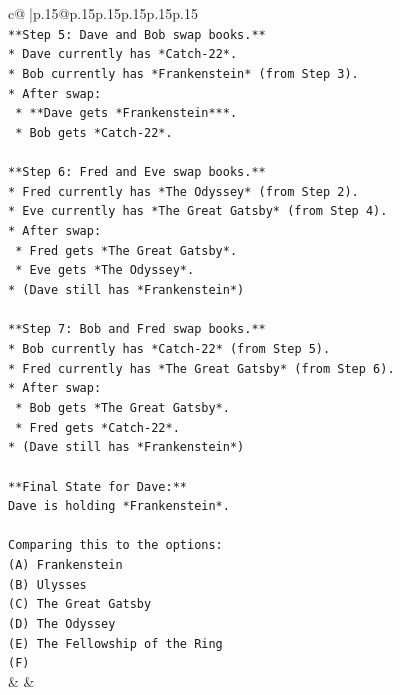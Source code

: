 \documentclass{article}
\begin{document}
{\begin{supertabular}{c@{$\;$}|p{.15\linewidth}@{}p{.15\linewidth}p{.15\linewidth}p{.15\linewidth}p{.15\linewidth}p{.15\linewidth}}
{{{\\ 
\texttt{**Step 5: Dave and Bob swap books.**} \\
\texttt{*   Dave currently has *Catch{-}22*.} \\
\texttt{*   Bob currently has *Frankenstein* (from Step 3).} \\
\texttt{*   After swap:} \\
\texttt{    *   **Dave gets *Frankenstein***.} \\
\texttt{    *   Bob gets *Catch{-}22*.} \\
\\ 
\texttt{**Step 6: Fred and Eve swap books.**} \\
\texttt{*   Fred currently has *The Odyssey* (from Step 2).} \\
\texttt{*   Eve currently has *The Great Gatsby* (from Step 4).} \\
\texttt{*   After swap:} \\
\texttt{    *   Fred gets *The Great Gatsby*.} \\
\texttt{    *   Eve gets *The Odyssey*.} \\
\texttt{*   (Dave still has *Frankenstein*)} \\
\\ 
\texttt{**Step 7: Bob and Fred swap books.**} \\
\texttt{*   Bob currently has *Catch{-}22* (from Step 5).} \\
\texttt{*   Fred currently has *The Great Gatsby* (from Step 6).} \\
\texttt{*   After swap:} \\
\texttt{    *   Bob gets *The Great Gatsby*.} \\
\texttt{    *   Fred gets *Catch{-}22*.} \\
\texttt{*   (Dave still has *Frankenstein*)} \\
\\ 
\texttt{**Final State for Dave:**} \\
\texttt{Dave is holding *Frankenstein*.} \\
\\ 
\texttt{Comparing this to the options:} \\
\texttt{(A) Frankenstein} \\
\texttt{(B) Ulysses} \\
\texttt{(C) The Great Gatsby} \\
\texttt{(D) The Odyssey} \\
\texttt{(E) The Fellowship of the Ring} \\
\texttt{(F)} \\
            }
        }
    }
    & & \\ \\


\end{supertabular}}
\end{document}
